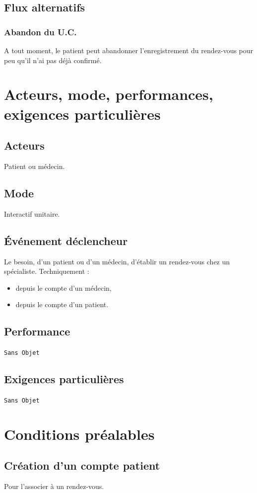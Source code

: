 \subsection{Flux alternatifs}

\subsubsection{Abandon du U.C.}
A tout moment, le patient peut abandonner l'enregistrement du rendez-vous pour
peu qu'il n'ai pas déjà confirmé.
\newpage

\section{Acteurs, mode, performances, exigences particulières}
\subsection{Acteurs}
Patient ou médecin.
\subsection{Mode}
Interactif unitaire.
\subsection{Événement déclencheur}
Le besoin, d'un patient ou d'un médecin, d'établir un rendez-vous chez un
spécialiste.
Techniquement :
\begin{itemize}
	\item depuis le compte d'un médecin,
	\item depuis le compte d'un patient.
\end{itemize}

\subsection{Performance}
\texttt{Sans Objet}
\subsection{Exigences particulières}
\texttt{Sans Objet}
\newpage

\section{Conditions préalables}
\subsection{Création d'un compte patient}
Pour l'associer à un rendez-vous.
